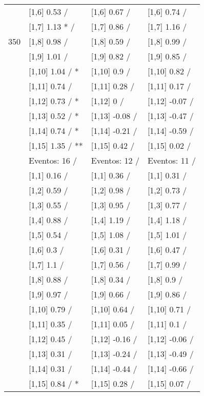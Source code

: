 \begin{table}
\begin{tabular}[t]{llll}
 & {}[1,6] 0.53  / & {}[1,6] 0.67  / & {}[1,6] 0.74  /\\
 & {}[1,7] 1.13 * / & {}[1,7] 0.86  / & {}[1,7] 1.16  /\\
350 & {}[1,8] 0.98  / & {}[1,8] 0.59  / & {}[1,8] 0.99  /\\
\addlinespace
 & {}[1,9] 1.01  / & {}[1,9] 0.82  / & {}[1,9] 0.85  /\\
 & {}[1,10] 1.04  / * & {}[1,10] 0.9  / & {}[1,10] 0.82  /\\
 & {}[1,11] 0.74  / & {}[1,11] 0.28  / & {}[1,11] 0.17  /\\
 & {}[1,12] 0.73  / * & {}[1,12] 0  / & {}[1,12] -0.07  /\\
 & {}[1,13] 0.52  / * & {}[1,13] -0.08  / & {}[1,13] -0.47  /\\
\addlinespace
 & {}[1,14] 0.74  / * & {}[1,14] -0.21  / & {}[1,14] -0.59  /\\
 & {}[1,15] 1.35  / ** & {}[1,15] 0.42  / & {}[1,15] 0.02  /\\
 & Eventos:  16 / & Eventos:  12 / & Eventos:  11 /\\
 & {}[1,1] 0.16  / & {}[1,1] 0.36  / & {}[1,1] 0.31  /\\
 & {}[1,2] 0.59  / & {}[1,2] 0.98  / & {}[1,2] 0.73  /\\
\addlinespace
 & {}[1,3] 0.55  / & {}[1,3] 0.95  / & {}[1,3] 0.77  /\\
 & {}[1,4] 0.88  / & {}[1,4] 1.19  / & {}[1,4] 1.18  /\\
 & {}[1,5] 0.54  / & {}[1,5] 1.08  / & {}[1,5] 1.01  /\\
 & {}[1,6] 0.3  / & {}[1,6] 0.31  / & {}[1,6] 0.47  /\\
 & {}[1,7] 1.1  / & {}[1,7] 0.56  / & {}[1,7] 0.99  /\\
\addlinespace
500 & {}[1,8] 0.88  / & {}[1,8] 0.34  / & {}[1,8] 0.9  /\\
 & {}[1,9] 0.97  / & {}[1,9] 0.66  / & {}[1,9] 0.86  /\\
 & {}[1,10] 0.79  / & {}[1,10] 0.64  / & {}[1,10] 0.71  /\\
 & {}[1,11] 0.35  / & {}[1,11] 0.05  / & {}[1,11] 0.1  /\\
 & {}[1,12] 0.45  / & {}[1,12] -0.16  / & {}[1,12] -0.06  /\\
\addlinespace
 & {}[1,13] 0.31  / & {}[1,13] -0.24  / & {}[1,13] -0.49  /\\
 & {}[1,14] 0.31  / & {}[1,14] -0.44  / & {}[1,14] -0.66  /\\
 & {}[1,15] 0.84  / * & {}[1,15] 0.28  / & {}[1,15] 0.07  /\\
\bottomrule
\end{tabular}
\end{table}
